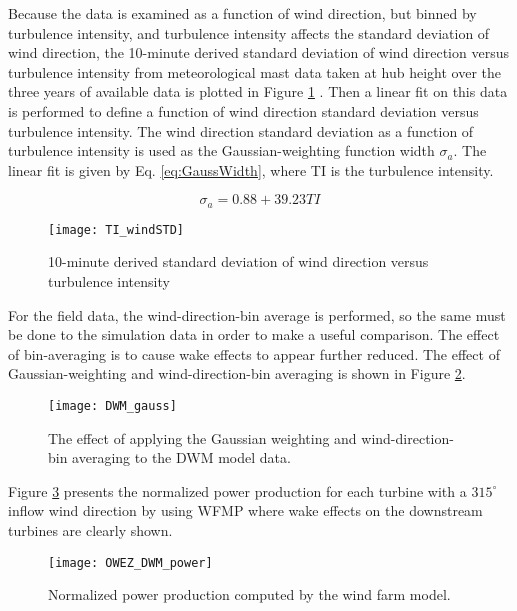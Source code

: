 \documentclass{umthesis}
\begin{document}
Because the data is examined as a function of wind direction, but binned by turbulence intensity, and turbulence intensity affects the standard deviation of wind direction, the 10-minute derived standard deviation of wind direction versus turbulence intensity from meteorological mast data taken at hub height over the three years of available data is plotted in Figure \ref{fig:TI_windSTD} \cite{dwm_les_owez}. Then a linear fit on this data is performed to define a function of wind direction standard deviation versus turbulence intensity. The wind direction standard deviation as a function of turbulence intensity is used as the Gaussian-weighting function width $\sigma_a$. The linear fit is given by Eq. \ref{eq:GaussWidth}, where TI is the turbulence intensity. 

\begin{equation}\label{eq:GaussWidth}
  \sigma_a=0.88+39.23TI
\end{equation}

\begin{figure}
  \centering
  \texttt{[image: TI\_windSTD]}
  \caption{10-minute derived standard deviation of wind direction versus turbulence intensity}\label{fig:TI_windSTD}
\end{figure}

For the field data, the wind-direction-bin average is performed, so the same must be done to the simulation data in order to make a useful comparison. The effect of bin-averaging is to cause wake effects to appear further reduced. The effect of Gaussian-weighting and wind-direction-bin averaging is shown in Figure \ref{fig:DWM_gauss}.

\begin{figure}
  \centering
  \texttt{[image: DWM\_gauss]}
  \caption{The effect of applying the Gaussian weighting and wind-direction-bin averaging to the DWM model data.}\label{fig:DWM_gauss}
\end{figure}

Figure \ref{fig:OWEZ_DWM_power} presents the normalized power production for each turbine with a $315^\circ$ inflow wind direction by using WFMP where wake effects on the downstream turbines are clearly shown.
\begin{figure}
  \centering
  \texttt{[image: OWEZ\_DWM\_power]}
  \caption{Normalized power production computed by the wind farm model.}\label{fig:OWEZ_DWM_power}
\end{figure}
\end{document}
